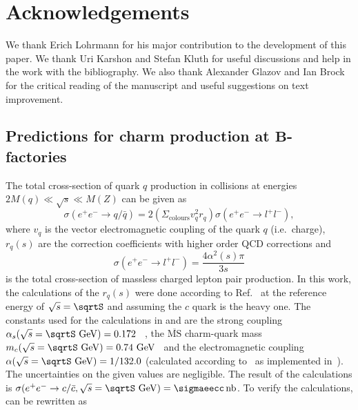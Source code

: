 \section*{Acknowledgements}
\label{sec:ack}
We thank Erich Lohrmann for his major contribution to the development 
of this paper. We thank  Uri Karshon and Stefan Kluth  for useful 
discussions and help in the work with the bibliography.
We also thank  Alexander  Glazov  and Ian Brock
for the critical reading of the manuscript and 
useful suggestions on text improvement.
\FloatBarrier
\begin{appendices}
\section{Predictions for charm production at ${\pmb B}$-factories}
\label{sec:appendixA}
The  total   cross-section of quark $q$ production in \epem collisions 
at energies $2M(q) \ll \sqrt{s} \ll M(Z)$ can be given as
\begin{equation}\label{eq:cseeqq}
\sigma(e^+e^-\rightarrow q/\bar{q})=
2(\Sigma_{\text{colours}} v_q^2  r_q)\sigma(e^+e^-\rightarrow l^+l^-),
\end{equation}
where $v_q$ is the vector electromagnetic coupling of the quark $q$ 
(i.e.\  charge), $r_q(s)$ are the correction coefficients with higher 
order QCD corrections and
\begin{equation}\label{eq:cs}
\sigma(e^+e^-\rightarrow l^+l^-)=\frac{4\alpha^2(s)\pi}{3s}
\end{equation}
is the  total  cross-section of massless charged lepton pair production.
In this work, the calculations of the $r_q(s)$ were done according to 
Ref.~\cite{Chetyrkin:2000zk} at the reference energy of 
$\sqrt{s}=\sqrtS$  and assuming the $c$ quark is the heavy one. The 
constants used for the calculations in  and  are
the strong coupling $\alpha_s(\sqrt{s}=\sqrtS~\GeV)=0.172$
~\cite{Chetyrkin:2000zk}, the $\overline{\text{MS}}$ charm-quark mass 
$m_c(\sqrt{s}=\sqrtS~\GeV)=0.74~\GeV$~\cite{Chetyrkin:2000zk} and 
the electromagnetic coupling $\alpha(\sqrt{s}=\sqrtS~\GeV)=1/132.0$ 
(calculated according to~\cite{Altarelli:1989hx,Burkhardt:1989ky} as 
implemented in~\cite{Harris:1997zq}). The uncertainties on the given 
values are negligible. The result of the calculations is 
$\sigma(e^+e^-\rightarrow c/\bar{c},\sqrt{s}=\sqrtS~\GeV)=\sigmaeecc\,
\text{nb}$.
To verify the calculations,  
  can be rewritten as 

\end{appendices}
